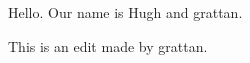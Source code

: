 \documentclass{grattanAlpha}
\begin{document}
Hello. Our name is Hugh and grattan.


This is an edit made by grattan.
\end{document}

